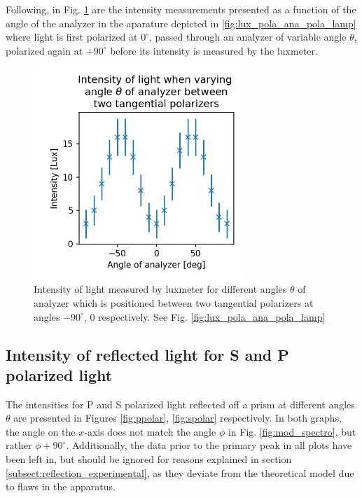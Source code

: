 \documentclass[%
 reprint,
 amsmath,amssymb,
 aps,
]{revtex4-1}
\begin{document}
  Following, in Fig. \ref{fig:malus2} are the intensity measurements presented as a function of the angle of the analyzer in the aparature depicted in \ref{fig:lux_pola_ana_pola_lamp} where light is first polarized at $0^\circ$, passed through an analyzer of variable angle $\theta$, polarized again at $+90^\circ$ before its intensity is measured by the luxmeter.
  
  \begin{figure}[h!]
    \center
    \includegraphics[width=8cm]{scripts/malus2.png}
    \caption{Intensity of light measured by luxmeter for different angles $\theta$ of analyzer which is positioned between two tangential polarizers at angles $-90^\circ$, $0$ respectively. See Fig. \ref{fig:lux_pola_ana_pola_lamp}}
    \label{fig:malus2}
  \end{figure}


  \subsection{Intensity of reflected light for S and P polarized light \label{sect:res_prism}}

  The intensities for P and S polarized light reflected off a prism at different angles $\theta$ are presented in Figures \ref{fig:ppolar}, \ref{fig:spolar} respectively. In both graphs, the angle on the $x$-axis does not match the angle $\phi$ in Fig. \ref{fig:mod_spectro}, but rather $\phi + 90^\circ$. Additionally, the data prior to the primary peak in all plots have been left in, but should be ignored for reasons explained in section \ref{subsect:reflection_experimental}, as they deviate from the theoretical model due to flaws in the apparatus.
\end{document}
